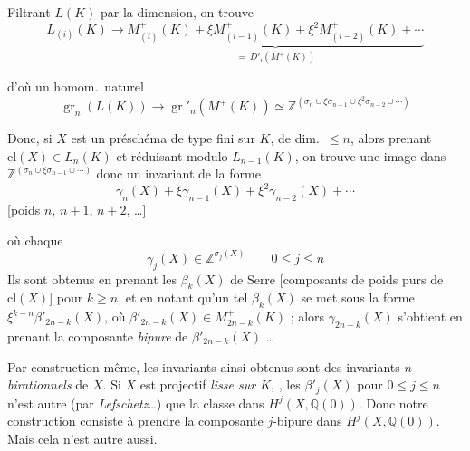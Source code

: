\documentclass[11pt,a4paper]{article}
\begin{document}

Filtrant $L(K)$ par la dimension, on trouve
\[
  L_{(i)}(K) \longrightarrow \underbrace{M^{+}_{(i)}(K) + \xi M^{+}_{(i-1)}(K) + \xi^{2} M^{+}_{(i-2)}(K) + \cdots}_{=\ D'_{i}(M^{+}(K))}
\]

d'où un homom.\ naturel
\[
  \operatorname{gr}_{n}(L(K)) \longrightarrow \operatorname{gr}'_{n}(M^{+}(K)) \simeq \mathbb{Z}^{(\sigma_{n} \cup \xi\sigma_{n-1} \cup \xi^{2}\sigma_{n-2} \cup \cdots)}
\]

Donc, si $X$ est un préschéma de type fini  sur $K$, de dim.\ $\leq n$, alors prenant $\mathrm{cl}(X) \in L_{n}(K)$ et réduisant modulo $L_{n-1}(K)$, on trouve une image dans $\mathbb{Z}^{(\sigma_{n} \cup \xi\sigma_{n-1} \cup \cdots)}$ donc un invariant de la forme
\[
  \gamma_{n}(X) + \xi\gamma_{n-1}(X) + \xi^{2}\gamma_{n-2}(X) + \cdots
\]
 [poids $n$, $n+1$, $n+2$, \ldots]

où chaque
\[
  \gamma_{j}(X) \in \mathbb{Z}^{\sigma_{j}(X)} \qquad 0 \leq j \leq n
\]
Ils sont obtenus en prenant les $\beta_{k}(X)$ de Serre [composants de poids purs de $\mathrm{cl}(X)$] pour $k \geq n$, et  en notant qu'un tel $\beta_{k}(X)$ se met sous la forme $\xi^{k-n}\beta'_{2n-k}(X)$, où $\beta'_{2n-k}(X) \in M^{+}_{2n-k}(K)$ ; alors $\gamma_{2n-k}(X)$ s'obtient en prenant la composante \emph{bipure} de $\beta'_{2n-k}(X)$ \ldots
{}

Par construction même, les invariants ainsi obtenus sont des invariants \emph{$n$-birationnels} de $X$. Si $X$ est projectif \emph{lisse sur $K$}, \struck{\ill{}}, les $\beta'_{j}(X)$ pour $0 \leq j \leq n$ n'est autre (par \emph{Lefschetz}\ldots) que la classe dans $H^{j}(X, \mathbb{Q}(0))$. Donc notre construction consiste à prendre la composante $j$-bipure dans $H^{j}(X, \mathbb{Q}(0))$. Mais cela n'est autre aussi.
\end{document}
